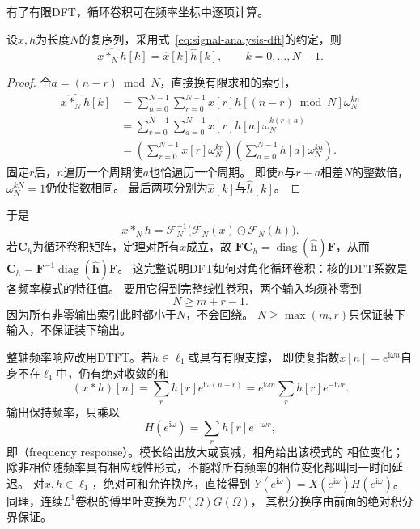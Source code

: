 有了有限DFT，循环卷积可在频率坐标中逐项计算。
\begin{theorem}[离散循环卷积定理]
  \label{thm:signal-analysis-circular-convolution-theorem}
  设$x,h$为长度$N$的复序列，采用式~\eqref{eq:signal-analysis-dft}的约定，则
  \[
    \widehat{x*_Nh}[k]=\widehat x[k]\widehat h[k],\qquad k=0,\ldots,N-1.
  \]
\end{theorem}
\begin{proof}
  令$a=(n-r)\bmod N$，直接换有限求和的索引，
  \begin{align*}
    \widehat{x*_Nh}[k]
    &=\sum_{n=0}^{N-1}\sum_{r=0}^{N-1}
      x[r]h[(n-r)\bmod N]\omega_N^{kn}\\
    &=\sum_{r=0}^{N-1}\sum_{a=0}^{N-1}
      x[r]h[a]\omega_N^{k(r+a)}\\
    &=\left(\sum_{r=0}^{N-1}x[r]\omega_N^{kr}\right)
      \left(\sum_{a=0}^{N-1}h[a]\omega_N^{ka}\right).
  \end{align*}
  固定$r$后，$n$遍历一个周期使$a$也恰遍历一个周期。
  即使$n$与$r+a$相差$N$的整数倍，$\omega_N^{kN}=1$仍使指数相同。
  最后两项分别为$\widehat x[k]$与$\widehat h[k]$。
\end{proof}
于是
\begin{equation}
  x*_Nh=\mathcal F_N^{-1}\bigl(\mathcal F_N(x)\odot\mathcal F_N(h)\bigr).
  \label{eq:signal-analysis-frequency-domain-convolution}
\end{equation}
若$\bm C_h$为循环卷积矩阵，定理对所有$x$成立，故
$\bm F\bm C_h=\operatorname{diag}(\widehat{\bm h})\bm F$，从而
$\bm C_h=\bm F^{-1}\operatorname{diag}(\widehat{\bm h})\bm F$。
这完整说明DFT如何对角化循环卷积：核的DFT系数是各频率模式的特征值。
要用它得到完整线性卷积，两个输入均须补零到
\begin{equation}
  N\geq m+r-1.
  \label{eq:signal-analysis-linear-padding-condition}
\end{equation}
因为所有非零输出索引此时都小于$N$，不会回绕。
$N\geq\max(m,r)$只保证装下输入，不保证装下输出。

整轴频率响应改用DTFT。若$h\in\ell_1$或具有有限支撑，
即使复指数$x[n]=e^{\mathrm i\omega n}$自身不在$\ell_1$中，仍有绝对收敛的和
\[
  (x*h)[n]=\sum_r h[r]e^{\mathrm i\omega(n-r)}
  =e^{\mathrm i\omega n}\sum_r h[r]e^{-\mathrm i\omega r}.
\]
输出保持频率，只乘以
\begin{equation}
  H(e^{\mathrm i\omega})=\sum_r h[r]e^{-\mathrm i\omega r},
  \label{eq:signal-analysis-filter-frequency-response}
\end{equation}
即（frequency response）。模长给出放大或衰减，相角给出该模式的
相位变化；除非相位随频率具有相应线性形式，不能将所有频率的相位变化都叫同一时间延迟。
对$x,h\in\ell_1$，绝对可和允许换序，直接得到
$Y(e^{\mathrm i\omega})=X(e^{\mathrm i\omega})H(e^{\mathrm i\omega})$。
同理，连续$L^1$卷积的傅里叶变换为$F(\Omega)G(\Omega)$，
其积分换序由前面的绝对积分界保证。


